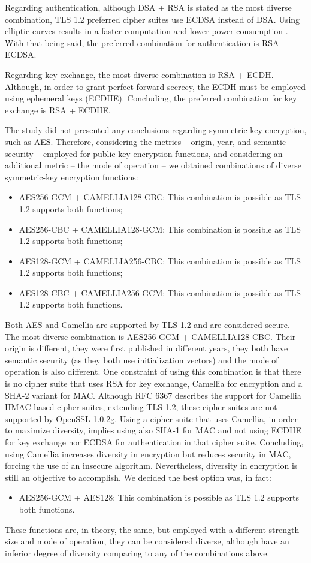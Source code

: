\documentclass{sig-alternate-05-2015}
\begin{document}
Regarding authentication, although DSA + RSA is stated as the most diverse combination, TLS 1.2 preferred cipher suites use ECDSA instead of DSA. Using elliptic curves results in a faster computation and lower power consumption \cite{Gupta02}. With that being said, the preferred combination for authentication is RSA + ECDSA.

Regarding key exchange, the most diverse combination is RSA + ECDH. Although, in order to grant perfect forward secrecy, the ECDH must be employed using ephemeral keys (ECDHE). Concluding, the preferred combination for key exchange is RSA + ECDHE.

The study did not presented any conclusions regarding symmetric-key encryption, such as AES. Therefore, considering the metrics -- origin, year, and semantic security -- employed for public-key encryption functions, and considering an additional metric -- the mode of operation -- we obtained combinations of diverse symmetric-key encryption functions:
\begin{itemize}
\item {AES256-GCM + CAMELLIA128-CBC: This combination is possible as TLS 1.2 supports both functions;}
\item {AES256-CBC + CAMELLIA128-GCM: This combination is possible as TLS 1.2 supports both functions;}
\item {AES128-GCM + CAMELLIA256-CBC: This combination is possible as TLS 1.2 supports both functions;}
\item {AES128-CBC + CAMELLIA256-GCM: This combination is possible as TLS 1.2 supports both functions.}
\end{itemize}

Both AES and Camellia are supported by TLS 1.2 and are considered secure. The most diverse combination is AES256-GCM + CAMELLIA128-CBC. Their origin is different, they were first published in different years, they both have semantic security (as they both use initialization vectors) and the mode of operation is also different. One constraint of using this combination is that there is no cipher suite that uses RSA for key exchange, Camellia for encryption and a SHA-2 variant for MAC. Although RFC 6367 \cite{RFC6367} describes the support for Camellia HMAC-based cipher suites, extending TLS 1.2, these cipher suites are not supported by OpenSSL 1.0.2g. Using a cipher suite that uses Camellia, in order to maximize diversity, implies using also SHA-1 for MAC and not using ECDHE for key exchange nor ECDSA for authentication in that cipher suite. Concluding, using Camellia increases diversity in encryption but reduces security in MAC, forcing the use of an insecure algorithm. Nevertheless, diversity in encryption is still an objective to accomplish. We decided the best option was, in fact:
\begin{itemize}
\item {AES256-GCM + AES128: This combination is possible as TLS 1.2 supports both functions.}
\end{itemize}
These functions are, in theory, the same, but employed with a different strength size and mode of operation, they can be considered diverse, although have an inferior degree of diversity comparing to any of the combinations above.
\end{document}
